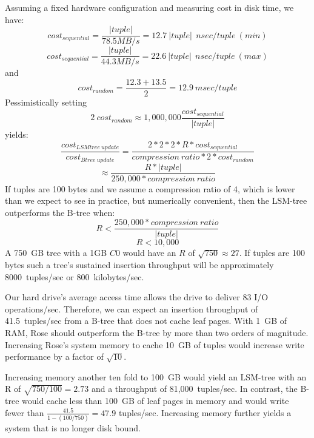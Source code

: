 \documentclass{vldb}
\newcommand{\rows}{Rose\xspace}
\newcommand{\rowss}{Rose's\xspace}
\begin{document}
Assuming a fixed hardware configuration and measuring cost in disk
time, we have:
\[
   cost_{sequential}=\frac{|tuple|}{78.5MB/s}=12.7~|tuple|~~nsec/tuple~(min)
\]
\[
   cost_{sequential}=\frac{|tuple|}{44.3MB/s}=22.6~|tuple|~~nsec/tuple~(max)
\]
and
\[
   cost_{random}=\frac{12.3+13.5}{2} = 12.9~msec/tuple
\]
Pessimistically setting
\[
2~cost_{random}\approx1,000,000\frac{cost_{sequential}}{|tuple|}
\] yields: \[
    \frac{cost_{LSMtree~update}}{cost_{Btree~update}}=\frac{2*2*2*R*cost_{sequential}}{compression~ratio*2*cost_{random}}
\]
\[
   \approx\frac{R*|tuple|}{250,000*compression~ratio}
\]
If tuples are 100 bytes and we assume a compression ratio of 4, which is lower
than we expect to see in practice, but numerically convenient, then the
LSM-tree outperforms the B-tree when:
\[
    R < \frac{250,000*compression~ratio}{|tuple|}
\]
\[
    R < 10,000
\]
A 750~GB tree with a 1GB $C0$ would have an $R$ of $\sqrt{750}\approx27$.  
If tuples are 100 bytes such a tree's sustained insertion throughput will be
approximately 8000~tuples/sec or 800~kilobytes/sec.

Our hard drive's average access time allows the drive to deliver 83 I/O operations/sec.
Therefore, we can expect an insertion throughput of 41.5~tuples/sec from a B-tree
that does not cache leaf pages.  With 1~GB of RAM, \rows should outperform the
B-tree by more than two orders of magnitude.  Increasing \rowss system
memory to cache 10~GB of tuples would increase write performance by a
factor of $\sqrt{10}$.


Increasing memory another ten fold to 100~GB would yield an LSM-tree
with an R of $\sqrt{750/100} = 2.73$ and a throughput of 81,000~tuples/sec.
In contrast, the B-tree would cache less than 100~GB of leaf pages
in memory and would write fewer than $\frac{41.5}{1-(100/750)} = 47.9$
tuples/sec.  Increasing memory further yields a system that
is no longer disk bound.
\end{document}
